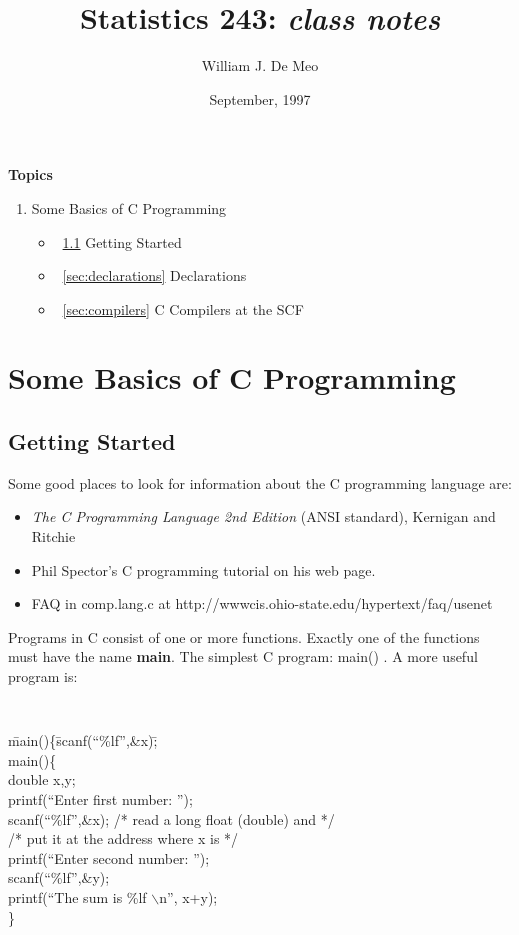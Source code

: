 \documentclass{article}
\begin{document}
\title{Statistics 243: \emph{class notes}}
\author{William J. De Meo}
\date{September, 1997}
\maketitle

{\bf Topics}\\
\begin{enumerate}
\item Some Basics of C Programming
\begin{itemize}
\item ~\ref{sec:gettingstarted} Getting Started \\
\item ~\ref{sec:declarations} Declarations \\
\item ~\ref{sec:compilers} C Compilers at the SCF
\end{itemize}
\end{enumerate}

\section{Some Basics of C Programming}
\subsection{Getting Started}
\label{sec:gettingstarted}

Some good places to look for information about the C programming language are:
\begin{itemize}
\item \emph{The C Programming Language 2nd Edition} (ANSI standard), 
Kernigan and Ritchie \\
\item Phil Spector's C programming tutorial on his web page.
\item FAQ in comp.lang.c at http://wwwcis.ohio-state.edu/hypertext/faq/usenet
\end{itemize}

Programs in C consist of one or more functions.  
Exactly one of the functions must have the name {\bf main}.
The simplest C program: main(){ }.
A more useful program is:
{\tt
\begin{tabbing}
\=main()\{\=scanf(``\%lf'',\&x);\=   \kill \\
\> main()\{\>\> \\
\>\>        double x,y;\> \\
\>\>        printf(``Enter first number: '');\> \\
\>\>        scanf(``\%lf'',\&x); /* read a long float (double) and */\>\\
\>\>\>                           /* put it at the address where x is */\\
\>\>        printf(``Enter second number: '');\> \\
\>\>        scanf(``\%lf'',\&y);\> \\
\>\>        printf(``The sum is \%lf $\backslash$n'', x+y);\> \\
\}\>\>\>\\
\end{tabbing}
}
\end{document}
